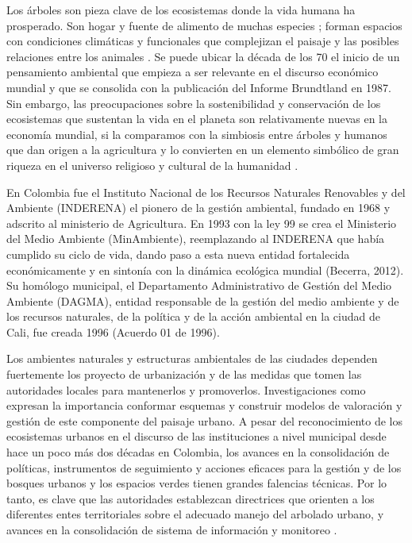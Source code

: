 \documentclass[12pt,]{book}
\begin{document}
Los árboles son pieza clave de los ecosistemas donde la vida humana ha
prosperado. Son hogar y fuente de alimento de muchas especies
\citep{osorio_vuelo_2009}; forman espacios con condiciones climáticas y
funcionales que complejizan el paisaje y las posibles relaciones entre
los animales \citep{chapman_forests_1998}. Se puede ubicar la década de
los 70 el inicio de un pensamiento ambiental que empieza a ser relevante
en el discurso económico mundial\citep{leff_pensamiento_2012} y que se
consolida con la publicación del Informe Brundtland en 1987. Sin
embargo, las preocupaciones sobre la sostenibilidad y conservación de
los ecosistemas que sustentan la vida en el planeta son relativamente
nuevas en la economía mundial, si la comparamos con la simbiosis entre
árboles y humanos que dan origen a la agricultura y lo convierten en un
elemento simbólico de gran riqueza en el universo religioso y cultural
de la humanidad \citep{leon_calle_arboles_2011}.

En Colombia fue el Instituto Nacional de los Recursos Naturales
Renovables y del Ambiente (INDERENA) el pionero de la gestión ambiental,
fundado en 1968 y adscrito al ministerio de Agricultura. En 1993 con la
ley 99 se crea el Ministerio del Medio Ambiente (MinAmbiente),
reemplazando al INDERENA que había cumplido su ciclo de vida, dando paso
a esta nueva entidad fortalecida económicamente y en sintonía con la
dinámica ecológica mundial (Becerra, 2012). Su homólogo municipal, el
Departamento Administrativo de Gestión del Medio Ambiente (DAGMA),
entidad responsable de la gestión del medio ambiente y de los recursos
naturales, de la política y de la acción ambiental en la ciudad de Cali,
fue creada 1996 (Acuerdo 01 de 1996).

Los ambientes naturales y estructuras ambientales de las ciudades
dependen fuertemente los proyecto de urbanización y de las medidas que
tomen las autoridades locales para mantenerlos y
promoverlos\citep{konijnendijk_arboles_2005, mincey_structuring_2013}.
Investigaciones como
\citep{dobbs_framework_2011, ponce_donoso_valoracion_2009} expresan la
importancia conformar esquemas y construir modelos de valoración y
gestión de este componente del paisaje urbano. A pesar del
reconocimiento de los ecosistemas urbanos en el discurso de las
instituciones a nivel municipal desde hace un poco más dos décadas en
Colombia, los avances en la consolidación de políticas, instrumentos de
seguimiento y acciones eficaces para la gestión y de los bosques urbanos
y los espacios verdes tienen grandes falencias técnicas. Por lo tanto,
es clave que las autoridades establezcan directrices que orienten a los
diferentes entes territoriales sobre el adecuado manejo del arbolado
urbano, y avances en la consolidación de sistema de información y
monitoreo \citep{tovar-corso_aproximacion_2013}.
\end{document}
